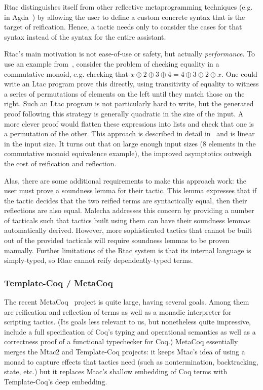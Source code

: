 Rtac distinguishes itself from other reflective metaprogramming techniques
(e.g. in Agda~\cite{agda-reflection}) by allowing the user to define a custom
concrete syntax that is the target of reification.
Hence, a tactic needs only to consider the cases for that syntax instead of the
syntax for the entire assistant.

Rtac's main motivation is not ease-of-use or safety, but actually
\emph{performance}.
To use an example from~\cite{rtac}, consider the problem of checking equality in
a commutative monoid, e.g. checking that $x \oplus 2 \oplus 3 \oplus 4 = 4
\oplus 3 \oplus 2 \oplus x$.
One could write an Ltac program prove this directly, using transitivity of
equality to witness a series of permutations of elements on the left until they
match those on the right.
Such an Ltac program is not particularly hard to write, but the generated proof
following this strategy is generally quadratic in the size of the input.
A more clever proof would flatten these expressions into lists and
check that one is a permutation of the other.
This approach is described in detail in~\cite{rtac} and is linear in the input
size.
It turns out that on large enough input sizes (8 elements in the commutative
monoid equivalence example), the improved asymptotics outweigh the cost of
reification and reflection.

Alas, there are some additional requirements to make this approach work:
the user must prove a soundness lemma for their tactic.
This lemma expresses that if the tactic decides that the two reified terms
are syntactically equal, then their reflections are also equal.
Malecha addresses this concern by providing a number of tacticals such that
tactics built using them can have their soundness lemmas automatically
derived.
However, more sophisticated tactics that cannot be built out of the provided
tacticals will require soundness lemmas to be proven manually.
Further limitations of the Rtac system is that its internal language is
simply-typed, so Rtac cannot reify dependently-typed terms.

\subsubsection{Template-Coq / MetaCoq}

The recent MetaCoq~\cite{metacoq} project is quite large, having several goals.
Among them are reification and reflection of terms as well as a monadic
interpreter for scripting tactics.
(Its goals less relevant to us, but nonetheless quite impressive, include a full
specification of Coq's typing and operational semantics as well as a correctness
proof of a functional typechecker for Coq.)
MetaCoq essentially merges the Mtac2 and Template-Coq projects:
it keeps Mtac's idea of using a monad to capture effects that tactics need
(such as nontermination, backtracking, state, etc.) but it replaces Mtac's
shallow embedding of Coq terms with Template-Coq's deep embedding.

